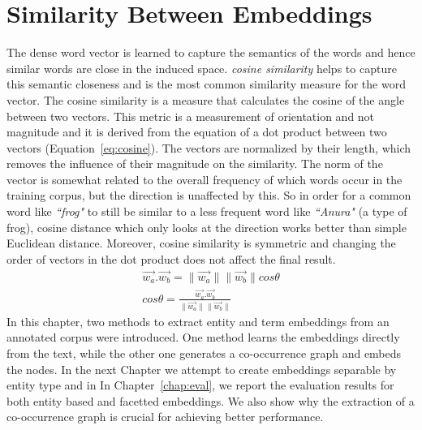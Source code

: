 \section{Similarity Between Embeddings }\label{sec:similarity}
The dense word vector is learned to capture the semantics of the words and hence similar words are close in the induced space. \emph{cosine similarity} helps to capture this semantic closeness and is the most common similarity measure for the word vector. The cosine similarity is a measure that calculates the cosine of the angle between two vectors. This metric is a measurement of orientation and not magnitude and it is derived from the equation of a dot product between two vectors (Equation~\ref{eq:cosine}). The vectors are normalized by their length, which removes the influence of their magnitude on the similarity. The norm of the vector is somewhat related to the overall frequency of which words occur in the training corpus, but the direction is unaffected by this. So in order for a common word like \emph{``frog"} to still be similar to a less frequent word like \emph{``Anura"} (a type of frog), cosine distance which only looks at the direction works better than simple Euclidean distance. Moreover, cosine similarity is symmetric and changing the order of vectors in the dot product does not affect the final result.
\begin{equation}
\begin{split}
\overrightarrow { w_a } .\overrightarrow { w_b } =\parallel \overrightarrow { w_a } \parallel \parallel \overrightarrow { w_b } \parallel cos\theta 
\\
cos\theta =\frac { \overrightarrow { w_a } .\overrightarrow { w_b }  }{ \parallel \overrightarrow { w_a } \parallel \parallel \overrightarrow { w_b } \parallel  } 
\end{split}
\label{eq:cosine}
\end{equation}
\ornament
In this chapter,  two methods to extract entity and term embeddings from an annotated corpus were introduced. One method learns the embeddings directly from the text, while the other one generates a co-occurrence graph and embeds the nodes. In the next Chapter we attempt to create embeddings separable by entity type and in In Chapter~\ref{chap:eval}, we report the evaluation results for both entity based and facetted embeddings. We also show why the extraction of a co-occurrence graph is crucial for achieving better performance. 



